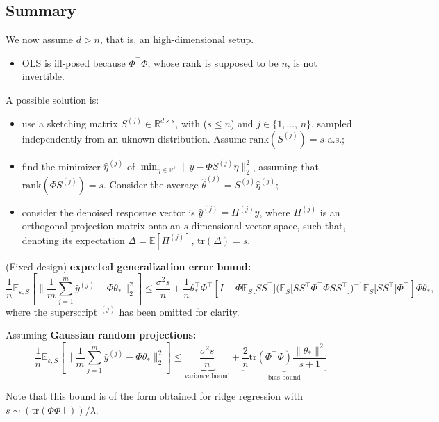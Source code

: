 \documentclass[
11pt,notheorems,hyperref={pdfauthor=whatever}
]{beamer}
\begin{document}
\subsection{Summary}
\begin{frame}
    We now assume \(d > n\), that is, an high-dimensional setup.
    \begin{itemize}
        \item OLS is \alert{ill-posed} because \(\Phi^\top\Phi\), whose rank is supposed to be \(n\), is not invertible.
    \end{itemize}

    A possible solution is:
    \begin{itemize}
        \item use a \alert{sketching matrix} \(S^{(j)} \in \mathbb{R}^{d \times s}\), with (\(s \le n\)) and \(j\in\{1,\dots,\,n\}\), sampled independently from an uknown distribution. Assume \(\text{rank}(S^{(j)}) = s\) a.s.;
        \item find the minimizer \(\hat{\eta}^{(j)}\) of \(\min_{\eta \in \mathbb{R}^s} \|y - \Phi S^{(j)}\eta\|_2^2\), assuming that \(\text{rank}(\Phi S^{(j)})=s\). Consider the average \(\hat{\theta}^{(j)} = S^{(j)}\hat{\eta}^{(j)}\);  
        \item consider the denoised resposnse vector is \(\hat{y}^{(j)} = \Pi^{(j)} y\), where \(\Pi^{(j)}\) is an \alert{orthogonal projection matrix} onto an \(s\)-dimensional vector space, such that, denoting its expectation \(\Delta = \mathbb{E}[\Pi^{(j)}]\), \(\text{tr}(\Delta) = s\).
    \end{itemize}
\end{frame}

\begin{frame}
    (Fixed design) \textbf{expected generalization error bound:}
    \[
        \frac{1}{n} \mathbb{E}_{\varepsilon, S} \left[ \bigg\| \frac{1}{m} \sum_{j=1}^m \hat{y}^{(j)} - \Phi\theta_* \bigg\|_2^2 \right] \le \frac{\sigma^2 s}{n} + \frac{1}{n} \theta_*^\top \Phi^\top \left[I - \Phi \mathbb{E}_S \big[SS^\top\big] \big( \mathbb{E}_S \big[SS^\top \Phi^\top \Phi SS^\top\big] \big)^{-1} \mathbb{E}_S \big[SS^\top\big] \Phi^\top\right]\Phi\theta_*,
    \]
    where the superscript \(^{(j)}\) has been omitted for clarity.

    \vspace{0.5em}
    Assuming \textbf{Gaussian random projections:} 
    \[
        \frac{1}{n} \mathbb{E}_{\varepsilon, S} \left[ \bigg\| \frac{1}{m} \sum_{j=1}^m \hat{y}^{(j)} - \Phi\theta_* \bigg\|_2^2 \right]\leq \underbrace{\frac{\sigma^2 s}{n}}_{\text{variance bound}} + \underbrace{\frac{2}{n}\text{tr}(\Phi^\top\Phi)\frac{\|\theta_*\|^2}{s+1}}_{\text{bias bound}}
    \]
    
    \vspace{0.25em}
    Note that this bound is of the form obtained for ridge regression with \(s\sim(\text{tr}(\Phi\Phi\top))/\lambda\).
\end{frame}
\end{document}
